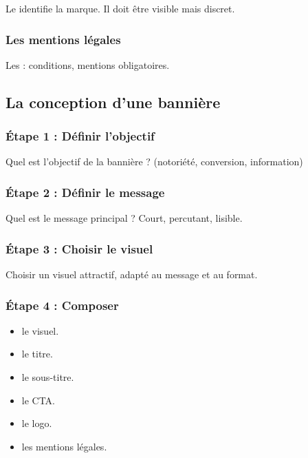 Le  identifie la marque. Il doit être visible mais discret.

\subsubsection{Les mentions légales}

Les  : conditions, mentions obligatoires.

\subsection{La conception d'une bannière}

\subsubsection{Étape 1 : Définir l'objectif}

Quel est l'objectif de la bannière ? (notoriété, conversion, information)

\subsubsection{Étape 2 : Définir le message}

Quel est le message principal ? Court, percutant, lisible.

\subsubsection{Étape 3 : Choisir le visuel}

Choisir un visuel attractif, adapté au message et au format.

\subsubsection{Étape 4 : Composer}

\begin{itemize}
    \item {} le visuel.
    \item {} le titre.
    \item {} le sous-titre.
    \item {} le CTA.
    \item {} le logo.
    \item {} les mentions légales.
\end{itemize}

